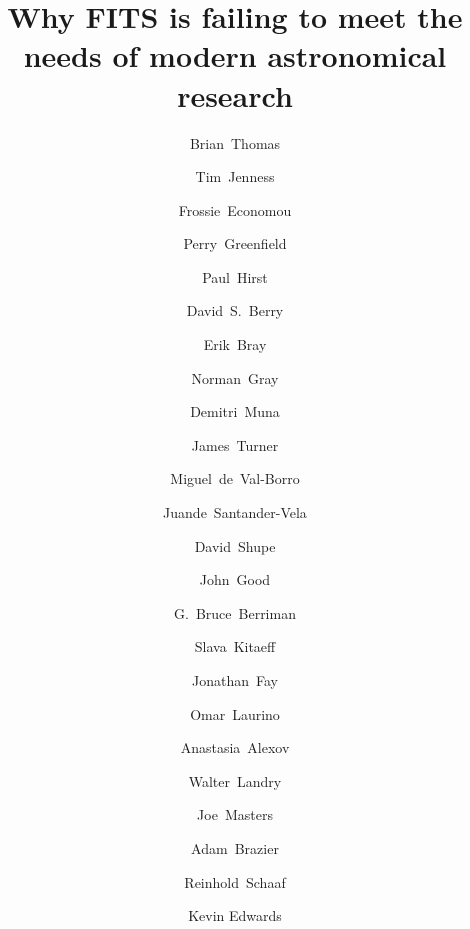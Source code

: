 \documentclass[final,authoryear,5p,times,twocolumn]{elsarticle}
\begin{document}
\begin{frontmatter}



\title{Why FITS is failing to meet the needs of modern astronomical research}


\author[noao]{Brian~Thomas}
\author[cornell]{Tim~Jenness}
\author[noao]{Frossie~Economou}
\author[stsci]{Perry~Greenfield}
\author[geminin]{Paul~Hirst}
\author[jac]{David~S.~Berry}
\author[stsci]{Erik~Bray}
\author[glasgow]{Norman~Gray}
\author[ohio]{Demitri~Muna}
\author[geminis]{James~Turner}
\author[princeton]{Miguel~de~Val-Borro}
\author[andalucia]{Juande~Santander-Vela}
\author[ipac]{David~Shupe}
\author[ipac]{John~Good}
\author[ipac]{G.~Bruce~Berriman}
\author[icrar]{Slava~Kitaeff}
\author[microsoft]{Jonathan~Fay}
\author[sao]{Omar~Laurino}
\author[stsci]{Anastasia~Alexov}
\author[ipac]{Walter~Landry}
\author[nrao]{Joe~Masters}
\author[cornell]{Adam~Brazier}
\author[aifa]{Reinhold~Schaaf}
\author[uwaterloo]{Kevin Edwards}



\end{frontmatter}
\end{document}
